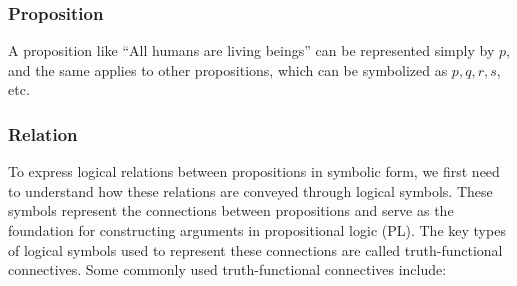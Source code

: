 \documentclass[12pt,a4paper,openany]{article}
\begin{document}
\subsubsection {Proposition}

A proposition like ``All humans are living beings'' can
be represented simply by \(p\), and the same applies to other
propositions, which can be symbolized as \(p, q, r, s\), etc.


\subsubsection {Relation}

To express logical relations between propositions in symbolic form, we
first need to understand how these relations are conveyed through
logical symbols. These symbols represent the connections between
propositions and serve as the foundation for constructing arguments in
propositional logic (PL). The key types of logical symbols used to
represent these connections are called truth-functional connectives.
Some commonly used truth-functional connectives include:
\end{document}
